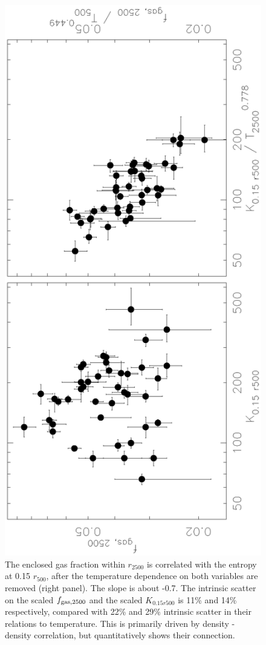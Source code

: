 \documentclass{aastex}
\begin{document}
\begin{figure}
\centerline{\includegraphics[height=0.95\linewidth,angle=270]{f18.ps}}
  \caption{The enclosed gas fraction within $r_{2500}$ is correlated with
the entropy at 0.15 $r_{500}$, after the temperature dependence on both variables
are removed (right panel). The slope is about -0.7. The intrinsic scatter on
the scaled $f_{\rm gas, 2500}$ and the scaled
$K_{0.15 r500}$ is 11\% and 14\% respectively, compared with 22\% and
29\% intrinsic scatter in their relations to temperature.
This is primarily driven by density - density correlation, but quantitatively
shows their connection.
}
\end{figure}
\end{document}
